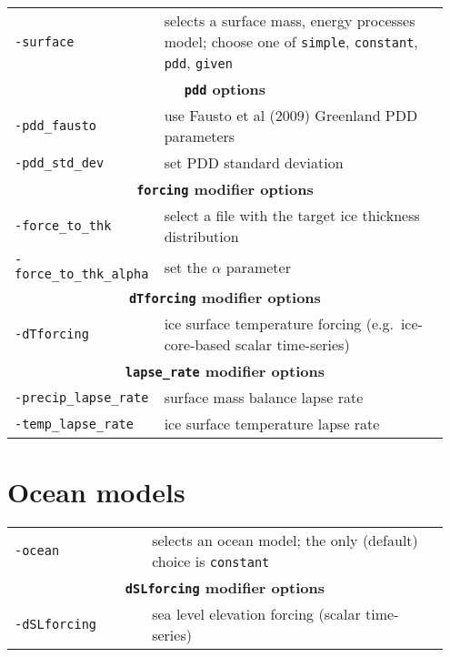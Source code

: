 \documentclass[landscape]{article}
\newcommand{\tabletitle}[1]{\multicolumn{2}{c}{\textbf{#1}}}
\begin{document}
\begin{textblock}{15}
\begin{tabular}{@{}p{0.3\linewidth}p{0.65\linewidth}@{}}
  \texttt{-surface} & selects a surface mass, energy processes model; choose one of
  \texttt{simple}, \texttt{constant}, \texttt{pdd}, \texttt{given}\\
  \tabletitle{\texttt{pdd} options} \\
  \texttt{-pdd_fausto} & use Fausto et al (2009) Greenland PDD parameters\\
  \texttt{-pdd_std_dev} & set PDD standard deviation\\
\tabletitle{\texttt{forcing} modifier options}\\
  \texttt{-force_to_thk} & select a file with the target ice thickness
  distribution\\
  \texttt{-force_to_thk_alpha} & set the $\alpha$ parameter\\
\tabletitle{\texttt{dTforcing} modifier options}\\
\texttt{-dTforcing} & ice surface temperature forcing (e.g.~ice-core-based
scalar time-series)\\
\tabletitle{\texttt{lapse_rate} modifier options}\\
\texttt{-precip_lapse_rate} & surface mass balance lapse rate\\
\texttt{-temp_lapse_rate} & ice surface temperature lapse rate
\end{tabular}

\section{Ocean models}
\label{sec:ocean-models}

\begin{tabular}{@{}p{0.3\linewidth}p{0.65\linewidth}@{}}
\texttt{-ocean} & selects an ocean model; the only (default) choice is
\texttt{constant} \\
\tabletitle{\texttt{dSLforcing} modifier options} \\
\texttt{-dSLforcing} & sea level elevation forcing (scalar time-series)\\
\end{tabular}


\end{textblock}
\end{document}
